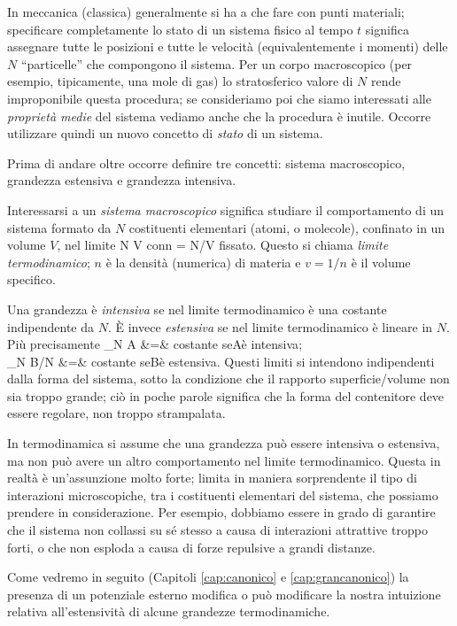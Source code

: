 In meccanica (classica) generalmente si ha a che fare con punti materiali; specificare completamente lo stato di un sistema fisico al tempo $t$ significa assegnare tutte le posizioni e tutte le velocità (equivalentemente i momenti) delle $N$ ``particelle'' che compongono il sistema. Per un corpo macroscopico (per esempio, tipicamente, una mole di gas) lo stratosferico valore di $N$ rende improponibile questa procedura; se consideriamo poi che siamo interessati alle {\em proprietà medie} del sistema vediamo anche che la procedura è inutile. Occorre utilizzare quindi un nuovo concetto di {\em stato} di un sistema.

Prima di andare oltre occorre definire tre concetti: sistema macroscopico, grandezza estensiva e grandezza intensiva.

Interessarsi a un {\em sistema macroscopico} significa studiare il comportamento di un sistema formato da $N$ costituenti elementari (atomi, o molecole), confinato in un volume $V$, nel limite
\be
N \to \infty \quad\quad V \to \infty \quad\quad \textrm{con}\;\;n = N/V\;\; \textrm{fissato}.
\ee
Questo si chiama {\em limite termodinamico}; $n$ è la densità (numerica) di materia e $v = 1/n$ è il volume specifico.

Una grandezza è {\em intensiva} se nel limite termodinamico è una costante indipendente da $N$. È invece {\em estensiva} se nel limite termodinamico è lineare in $N$. Più precisamente
\bea
\lim_{N\to\infty} A &=& \textrm{costante} \quad\quad \textrm{se}\;\;A\;\;\textrm{è intensiva}; \nonumber\\
\lim_{N\to\infty} B/N &=& \textrm{costante} \quad\quad \textrm{se}\;\;B\;\;\textrm{è estensiva}.
\eea
Questi limiti si intendono indipendenti dalla forma del sistema, sotto la condizione che il rapporto superficie/volume non sia troppo grande; ciò in poche parole significa che la forma del contenitore deve essere regolare, non troppo strampalata.

In termodinamica si assume che una grandezza può essere intensiva o estensiva, ma non può avere un altro comportamento nel limite termodinamico. Questa in realtà è un'assunzione molto forte; limita in maniera sorprendente il tipo di interazioni microscopiche, tra i costituenti elementari del sistema, che possiamo prendere in considerazione. Per esempio, dobbiamo essere in grado di garantire che il sistema non collassi su sé stesso a causa di interazioni attrattive troppo forti, o che non esploda a causa di forze repulsive a grandi distanze.

Come vedremo in seguito (Capitoli \ref{cap:canonico} e \ref{cap:grancanonico}) la presenza di un potenziale esterno modifica o può modificare la nostra intuizione relativa all'estensività di alcune grandezze termodinamiche.

